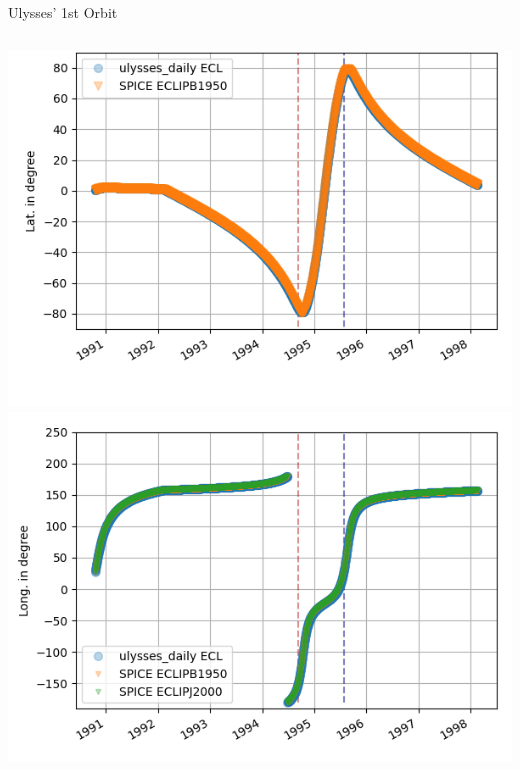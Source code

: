 \documentclass{beamer}
\begin{document}
\begin{frame}{Ulysses' 1st Orbit}
\begin{columns}
	\begin{column}{0.5\textwidth}
		\vspace{-.5cm}
		\includegraphics[width=1.15\textwidth]{Pics/ECL_LAT.png}
		\vspace{-.5cm}
		\includegraphics[width=1.15\textwidth]{Pics/ECL_LONG.png}
	\end{column}
\end{columns}

\end{frame}
\end{document}
